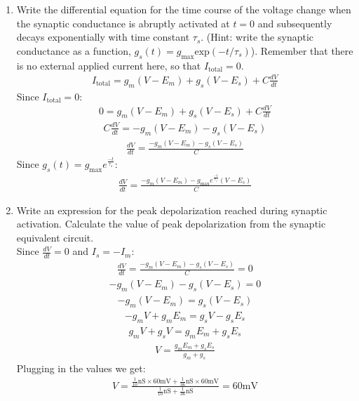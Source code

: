 \documentclass[11pt]{article}
\begin{document}
\begin{enumerate}[label=\arabic*.]
\begin{enumerate}[label=(\alph*)]
\item
Write the differential equation for the time course of the voltage change when the synaptic conductance is abruptly activated at $t = 0$ and subsequently decays exponentially with time constant $\tau_s$. (Hint: write the synaptic conductance as a function, $g_s(t) = g_{\text{max}} \text{exp}(-t / \tau_s)$). Remember that there is no external applied current here, so that $I_{\text{total}} = 0$.
\begin{align*}
I_{\text{total}} = g_m (V - E_m) + g_s (V - E_s) + C \frac{dV} {dt}
\end{align*}
Since $I_{\text{total}} = 0$:
\begin{align*}
0 = g_m (V - E_m) + g_s (V - E_s) + C \frac{dV} {dt}
\end{align*}
\begin{align*}
C \frac{dV} {dt} = -g_m (V - E_m) - g_s (V - E_s)
\end{align*}
\begin{align*}
\frac{dV} {dt} = \frac{-g_m (V - E_m) - g_s (V - E_s)} {C}
\end{align*}
Since $g_s(t) = g_{\text{max}} e^{\frac{-t} {\tau_s}}$:
\begin{align*}
\frac{dV} {dt} = \frac{-g_m (V - E_m) - g_{\text{max}} e^{\frac{-t} {\tau_s}} (V - E_s)} {C}
\end{align*}



\item
Write an expression for the peak depolarization reached during synaptic activation. Calculate the value of peak depolarization from the synaptic equivalent circuit.
\vspace*{1\baselineskip}
\\
Since $\frac{dV} {dt} = 0$ and $I_s = -I_m$:
\begin{align*}
\frac{dV} {dt} = \frac{-g_m (V - E_m) - g_s (V - E_s)} {C} = 0
\end{align*}
\begin{align*}
-g_m (V - E_m) - g_s (V - E_s) = 0
\end{align*}
\begin{align*}
-g_m (V - E_m) = g_s (V - E_s)
\end{align*}
\begin{align*}
-g_m V + g_m E_m = g_s V - g_s E_s
\end{align*}
\begin{align*}
g_m V + g_s V = g_m E_m + g_s E_s
\end{align*}
\begin{align*}
V = \frac{g_m E_m + g_s E_s} {g_m + g_s}
\end{align*}
Plugging in the values we get:
\begin{align*}
V = \frac{\frac{1} {10} \text{nS} \times 60 \text{mV} + \frac{1} {36} \text{nS} \times 60 \text{mV}} {\frac{1} {10} \text{nS} + \frac{1} {36} \text{nS}} = 60 \text{mV}
\end{align*}




\end{enumerate}
\end{enumerate}
\end{document}
